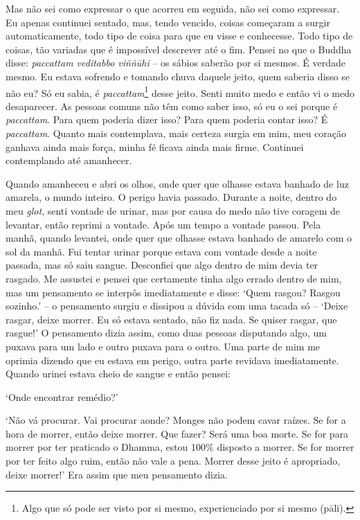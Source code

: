 Mas não sei como expressar o que acorreu em seguida, não sei como
expressar. Eu apenas continuei sentado, mas, tendo vencido, coisas
começaram a surgir automaticamente, todo tipo de coisa para que eu visse
e conhecesse. Todo tipo de coisas, tão variadas que é impossível
descrever até o fim. Pensei no que o Buddha disse: \emph{paccattam
veditabbo viññūhi} -- os sábios saberão por si mesmos. É verdade mesmo.
Eu estava sofrendo e tomando chuva daquele jeito, quem saberia disso se
não eu? Só eu sabia, é \emph{paccattam}\footnote{Algo que só pode ser
  visto por si mesmo, experienciado por si mesmo (pāli).} desse jeito.
Senti muito medo e então vi o medo desaparecer. As pessoas comuns não
têm como saber isso, só eu o sei porque é \emph{paccattam}. Para quem
poderia dizer isso? Para quem poderia contar isso? É \emph{paccattam}.
Quanto mais contemplava, mais certeza surgia em mim, meu coração ganhava
ainda mais força, minha fé ficava ainda mais firme. Continuei
contemplando até amanhecer.

Quando amanheceu e abri os olhos, onde quer que olhasse estava banhado
de luz amarela, o mundo inteiro. O perigo havia passado. Durante a
noite, dentro do meu \emph{glot}, senti vontade de urinar, mas por causa
do medo não tive coragem de levantar, então reprimi a vontade. Após um
tempo a vontade passou. Pela manhã, quando levantei, onde quer que
olhasse estava banhado de amarelo com o sol da manhã. Fui tentar urinar
porque estava com vontade desde a noite passada, mas só saiu sangue.
Desconfiei que algo dentro de mim devia ter rasgado. Me assustei e
pensei que certamente tinha algo errado dentro de mim, mas um pensamento
se interpôs imediatamente e disse: `Quem rasgou? Rasgou sozinho.' -- o
pensamento surgiu e dissipou a dúvida com uma tacada só -- `Deixe
rasgar, deixe morrer. Eu só estava sentado, não fiz nada. Se quiser
rasgar, que rasgue!' O pensamento dizia assim, como duas pessoas
disputando algo, um puxava para um lado e outro puxava para o outro. Uma
parte de mim me oprimia dizendo que eu estava em perigo, outra parte
revidava imediatamente. Quando urinei estava cheio de sangue e então
pensei:

`Onde encontrar remédio?'

`Não vá procurar. Vai procurar aonde? Monges não podem cavar raízes. Se
for a hora de morrer, então deixe morrer. Que fazer? Será uma boa morte.
Se for para morrer por ter praticado o Dhamma, estou 100\% disposto a
morrer. Se for morrer por ter feito algo ruim, então não vale a pena.
Morrer desse jeito é apropriado, deixe morrer!' Era assim que meu
pensamento dizia.

